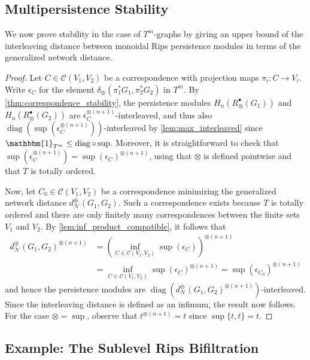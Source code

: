 \documentclass[a4paper,11pt]{article}
\newcommand{\Id}{\mathbbm{1}}
\newcommand{\tensor}{\otimes}
\newcommand{\atensor}{\oplus}
\DeclareMathOperator{\diag}{diag}
\DeclareMathOperator{\supa}{sup}
\theoremstyle{remark}
\begin{document}
\subsection{Multipersistence Stability}\label{sec:multipersistence_stability}
We now prove stability in the case of $T^m$-graphs by giving an upper bound of the interleaving distance between monoidal Rips persistence modules in terms of the generalized network distance.

\generalizednetworkdistancestability
\begin{proof}
\sloppy Let $C\in\mathcal{C}(V_1,V_2)$ be a correspondence with projection maps $\pi_i\colon C\to V_i$. Write $\epsilon_C$ for the element $\delta_\atensor(\pi_1^*G_1,\pi_2^*G_2)$ in $T^m$. By \cref{thm:correspondence_stability}, the persistence modules $H_n(R^\bullet_\tensor(G_1))$ and $H_n(R^\bullet_\tensor(G_2))$ are $\epsilon_C^{\tensor (n+1)}$-interleaved, and thus also $\diag(\supa(\epsilon_C^{\tensor (n+1)}))$-interleaved by \cref{lem:max_interleaved} since $\Id_{T^m}\leq\diag\circ\supa$. Moreover, it is straightforward to check that $\supa(\epsilon_C^{\tensor (n+1)})=\supa(\epsilon_C)^{\tensor (n+1)}$, using that $\tensor$ is defined pointwise and that $T$ is totally ordered.

Now, let $C_0\in\mathcal{C}(V_1,V_2)$ be a correspondence minimizing the generalized network distance $d_\mathcal{N}^\atensor(G_1,G_2)$. Such a correspondence exists because $T$ is totally ordered and there are only finitely many correspondences between the finite sets $V_1$ and $V_2$. By \cref{lem:inf_product_compatible}, it follows that 
\begin{align*}
d_\mathcal{N}^\atensor(G_1,G_2)^{\tensor (n+1)}&=\left(\inf_{C\in\mathcal{C}(V_1,V_2)} \supa(\epsilon_C)\right)^{\tensor (n+1)}\\&=\inf_{C\in\mathcal{C}(V_1,V_2)} \supa(\epsilon_C)^{\tensor (n+1)}=\supa(\epsilon_{C_0})^{\tensor (n+1)}
\end{align*}
and hence the persistence modules are $\diag(d_\mathcal{N}^\atensor(G_1,G_2)^{\tensor (n+1)})$-interleaved. Since the interleaving distance is defined as an infimum, the result now follows. For the case $\otimes=\sup$, observe that $t^{\tensor (n+1)}=t$ since $\sup\{t,t\}=t$.
\end{proof}

\subsection{Example: The Sublevel Rips Bifiltration}\label{sec:sublevel_rips_bifiltration}
\end{document}
